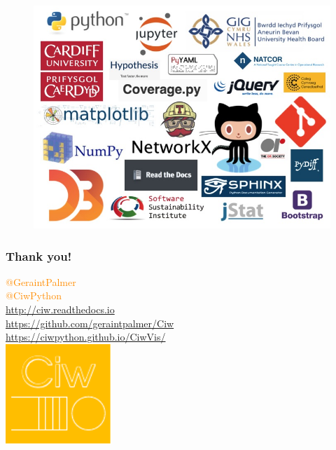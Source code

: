 \documentclass{beamer}
\begin{document}
\begin{frame}[plain]
\begin{figure}
    \includegraphics[width=\textwidth]{alllogos}
\end{figure}
\end{frame}

\begin{frame}
\frametitle{Thank you!}
\begin{center}
\textcolor{darkorange}{@GeraintPalmer}\\
\textcolor{darkorange}{@CiwPython}\\
\textcolor{darkorange}{\url{http://ciw.readthedocs.io}}\\
\textcolor{darkorange}{\url{https://github.com/geraintpalmer/Ciw}}\\
\textcolor{darkorange}{\url{https://ciwpython.github.io/CiwVis/}}\\
\vfill
\includegraphics[width=0.3\textwidth]{logos/ciw_logo.pdf}
\end{center}
\end{frame}
\end{document}
